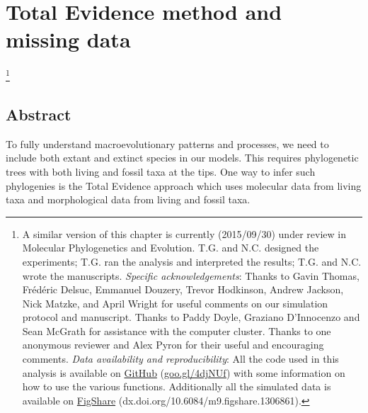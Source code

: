 

%
%

\chapter[Total Evidence method and missing data]{Total Evidence method and missing data}
\label{chap:TEM_paper}

\bigskip
\medskip
\begin{center}

\footnote{A similar version of this chapter is currently (2015/09/30) under review in Molecular Phylogenetics and Evolution. T.G. and N.C. designed the experiments; T.G. ran the analysis and interpreted the results; T.G. and N.C. wrote the manuscripts. \textit{Specific acknowledgements}: Thanks to Gavin Thomas, Fr\'{e}d\'{e}ric Delsuc, Emmanuel Douzery, Trevor Hodkinson, Andrew Jackson, Nick Matzke, and April Wright for useful comments on our simulation protocol and manuscript. Thanks to Paddy Doyle, Graziano D'Innocenzo and Sean McGrath for assistance with the computer cluster. Thanks to one anonymous reviewer and Alex Pyron for their useful and encouraging comments. \textit{Data availability and reproducibility}: All the code used in this analysis is available on \href{https://github.com/TGuillerme/Total_Evidence_Method-Missing_data}{GitHub} (\href{https://github.com/TGuillerme/Total_Evidence_Method-Missing_data}{goo.gl/4djNUf}) with some information on how to use the various functions. Additionally all the simulated data is available on \href{http://figshare.com/articles/Effect_of_missing_data_on_topological_inference_using_a_total_evidence_approach/1306861}{FigShare} (dx.doi.org/10.6084/m9.figshare.1306861).} \\

\end{center}
%
%
\section*{Abstract}
To fully understand macroevolutionary patterns and processes, we need to include both extant and extinct species in our models.
This requires phylogenetic trees with both living and fossil taxa at the tips.
One way to infer such phylogenies is the Total Evidence approach which uses molecular data from living taxa and morphological data from living and fossil taxa.

